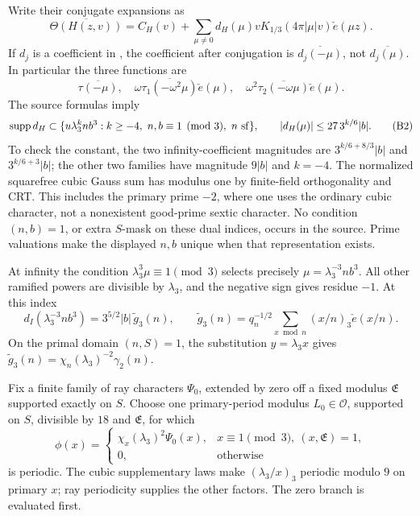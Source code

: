 \documentclass[12pt]{article}
\begin{document}
Write their conjugate expansions as
\[
 \overline{\Theta(H(z,v))}
   =C_H(v)+\sum_{\mu\ne0}d_H(\mu)vK_{1/3}(4\pi|\mu|v)
                                                 \check e(\mu z).
 \tag{B1}\label{eq:theta-cusp}
\]
If \(d_j\) is a coefficient in \cite{DR}, the coefficient after
conjugation is \(\overline{d_j(-\mu)}\), not
\(\overline{d_j(\mu)}\).  In particular the three functions are
\[
 \overline{\tau(-\mu)},\quad
 \omega\overline{\tau_1(-\omega^2\mu)}\check e(\mu),\quad
 \omega^2\overline{\tau_2(-\omega\mu)}\check e(\mu).
\]
The source formulas imply
\[
 \operatorname{supp}d_H\subset
 \{u\lambda_3^k n b^3:k\ge-4,\ n,b\equiv1\pmod3,\ n\ {\rm sf}\},
 \qquad |d_H(\mu)|\le27\,3^{k/6}|b|.
 \tag{B2}\label{eq:theta-support}
\]
To check the constant, the two infinity-coefficient magnitudes are
\(3^{k/6+8/3}|b|\) and \(3^{k/6+3}|b|\);
the other two families have magnitude \(9|b|\) and \(k=-4\).
The normalized squarefree cubic Gauss sum has modulus one by
finite-field orthogonality and CRT.  This includes the primary
prime \(-2\), where one uses the ordinary cubic character, not
a nonexistent good-prime sextic character.  No condition
\((n,b)=1\), or extra \(S\)-mask on these dual indices, occurs in
the source.  Prime valuations make the displayed \(n,b\) unique
when that representation exists.

At infinity the condition \(\lambda_3^3\mu\equiv1\pmod3\)
selects precisely \(\mu=\lambda_3^{-3}nb^3\).
All other ramified powers are divisible by \(\lambda_3\), and
the negative sign gives residue \(-1\).
At this index
\[
 d_I(\lambda_3^{-3}nb^3)
   =3^{5/2}|b|\,\widetilde g_3(n),\qquad
 \widetilde g_3(n)
 =q_n^{-1/2}\sum_{x\bmod n}(x/n)_3\check e(x/n).
 \tag{B3}
\]
On the primal domain \((n,S)=1\), the substitution
\(y=\lambda_3x\) gives
\(\widetilde g_3(n)=\chi_n(\lambda_3)^{-2}\gamma_2(n)\).

Fix a finite family of ray characters \(\Psi_0\), extended by
zero off a fixed modulus \(\mathfrak E\) supported exactly on \(S\).
Choose one primary-period modulus \(L_0\in\mathcal O\), supported
on \(S\), divisible by \(18\) and \(\mathfrak E\), for which
\[
 \phi(x)=
 \begin{cases}
  \chi_x(\lambda_3)^2\Psi_0(x),&x\equiv1\pmod3,\ (x,\mathfrak E)=1,\\
  0,&\text{otherwise}
 \end{cases}
 \tag{B4}
\]
is periodic.  The cubic supplementary laws make
\((\lambda_3/x)_3\) periodic modulo \(9\) on primary \(x\);
ray periodicity supplies the other factors.  The zero branch is
evaluated first.
\end{document}
